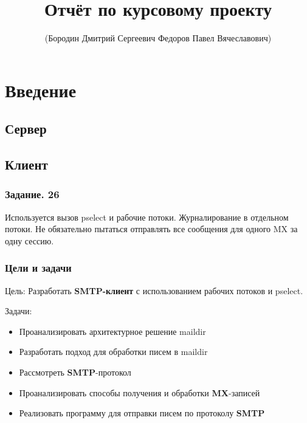 \documentclass[a4paper,12pt]{report}
\title{Отчёт по курсовому проекту}
\author{(Бородин Дмитрий Сергеевич  Федоров Павел Вячеславович)}
\begin{document}
\maketitle

\tableofcontents

\chapter*{Введение}

\section*{Сервер}

\section*{Клиент}

\subsection*{Задание. 26}
Используется вызов pselect и рабочие потоки. Журналирование в отдельном потоки. Не обязательно пытаться отправлять все сообщения для одного MX за одну сессию.
\subsection*{Цели и задачи}
Цель: 
    Разработать \textbf{SMTP-клиент} с использованием рабочих потоков и pselect.

Задачи:
\begin{itemize}
    \item Проанализировать архитектурное решение maildir
    \item Разработать подход для обработки писем в maildir 
    \item Рассмотреть \textbf{SMTP}-протокол
    \item Проанализировать способы получения и обработки \textbf{MX}-записей
    \item Реализовать программу для отправки писем по протоколу \textbf{SMTP}
\end{itemize}





\end{document}
